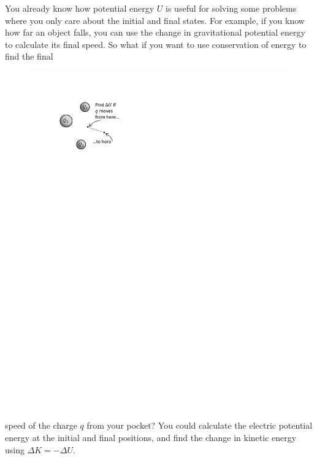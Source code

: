 You already know how potential energy $U$ is useful for solving some problems where you only care about the initial and final states.  For example, if you know how far an object falls, you can use the change in gravitational 
potential energy to calculate its final speed.  
So what if you want to use conservation of energy to find the final 
\begin{figure}
\begin{center}
\vspace{-0.3 in}
\includegraphics[scale=0.8]{potential_intro/activity_3_figs/charge_from_pocket_potential.pdf}
\end{center}
\end{figure}
speed of the charge $q$ from your pocket?  You could calculate the electric potential energy at the initial and final positions, and find the change in kinetic energy using $\Delta K = -\Delta U$.

